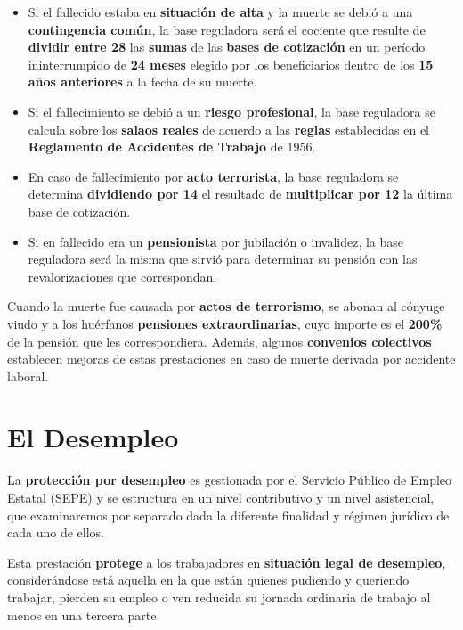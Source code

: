 \begin{itemize}
    \begin{itemize}
        \item Si el fallecido estaba en \textbf{situación de alta} y la muerte se debió a una \textbf{contingencia común}, la base reguladora será el cociente que resulte de \textbf{dividir entre 28} las \textbf{sumas} de las \textbf{bases de cotización} en un período ininterrumpido de \textbf{24 meses} elegido por los beneficiarios dentro de los \textbf{15 años anteriores} a la fecha de su muerte.
        \item Si el fallecimiento se debió a un \textbf{riesgo profesional}, la base reguladora se calcula sobre los \textbf{salaos reales} de acuerdo a las \textbf{reglas} establecidas en el \textbf{Reglamento de Accidentes de Trabajo} de 1956.
        \item En caso de fallecimiento por \textbf{acto terrorista}, la base reguladora se determina \textbf{dividiendo por 14} el resultado de \textbf{multiplicar por 12} la última base de cotización.
        \item Si en fallecido era un \textbf{pensionista} por jubilación o invalidez, la base reguladora será la misma que sirvió para determinar su pensión con las revalorizaciones que correspondan.
    \end{itemize}

    Cuando la muerte fue causada por \textbf{actos de terrorismo}, se abonan al cónyuge viudo y a los huérfanos \textbf{pensiones extraordinarias}, cuyo importe es el \textbf{200\%} de la pensión que les correspondiera. Además, algunos \textbf{convenios colectivos} establecen mejoras de estas prestaciones en caso de muerte derivada por accidente laboral.
\end{itemize}

\section{El Desempleo}
La \textbf{protección por desempleo} es gestionada por el Servicio Público de Empleo Estatal (SEPE) y se estructura en un nivel contributivo y un nivel asistencial, que examinaremos por separado dada la diferente finalidad y régimen jurídico de cada uno de ellos.

Esta prestación \textbf{protege} a los trabajadores en \textbf{situación legal de desempleo}, considerándose está aquella en la que están quienes pudiendo y queriendo trabajar, pierden su empleo o ven reducida su jornada ordinaria de trabajo al menos en una tercera parte.

